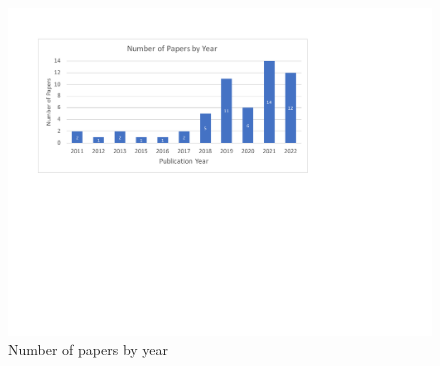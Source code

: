 
\begin{figure}[h]
  \centering
  \includegraphics[width=\columnwidth]{figures/fig-paper.pdf}
  \caption{Number of papers by year}
  \label{fig:paper}
\end{figure}